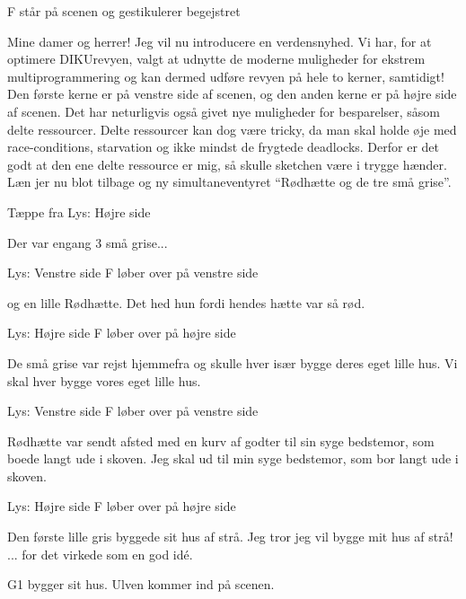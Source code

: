 \documentclass[a4paper,11pt]{article}
\begin{document}
\begin{sketch}

\scene F står på scenen og gestikulerer begejstret

 Mine damer og herrer! Jeg vil nu introducere en verdensnyhed.
 Vi har, for at optimere DIKUrevyen, valgt at udnytte de moderne muligheder for ekstrem multiprogrammering og kan dermed udføre revyen på hele to kerner, samtidigt!
     Den første kerne er på venstre side af scenen, og den anden kerne er på højre side af scenen.
 Det har neturligvis også givet nye muligheder for besparelser, såsom delte ressourcer.
    Delte ressourcer kan dog være tricky, da man skal holde øje med race-conditions, starvation og ikke mindst de frygtede deadlocks.
    Derfor er det godt at den ene delte ressource er mig, så skulle sketchen være i trygge hænder. 
 Læn jer nu blot tilbage og ny simultaneventyret ``Rødhætte og de tre små grise''.

\scene Tæppe fra
\scene Lys: Højre side

 Der var engang 3 små grise...

\scene Lys: Venstre side
\scene F løber over på venstre side

 og en lille Rødhætte. Det hed hun fordi hendes hætte var så rød.

\scene Lys: Højre side
\scene F løber over på højre side

 De små grise var rejst hjemmefra og skulle hver især bygge deres eget lille hus.
 Vi skal hver bygge vores eget lille hus.

\scene Lys: Venstre side
\scene F løber over på venstre side

 Rødhætte var sendt afsted med en kurv af godter til sin syge bedstemor, som boede langt ude i skoven.
 Jeg skal ud til min syge bedstemor, som bor langt ude i skoven. 

\scene Lys: Højre side
\scene F løber over på højre side

 Den første lille gris byggede sit hus af strå.
 Jeg tror jeg vil bygge mit hus af strå!
 ... for det virkede som en god idé.

\scene G1 bygger sit hus.
\scene Ulven kommer ind på scenen.


\end{sketch}
\end{document}
